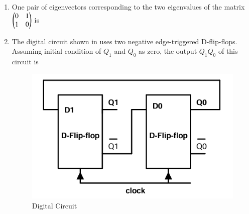 \documentclass[journal,12pt,onecolumn]{IEEEtran}
\theoremstyle{remark}
\begin{document}
\begin{enumerate}
\item One pair of eigenvectors corresponding to the two eigenvalues of the matrix $\begin{pmatrix}0 & 1 \\ 1 & 0\end{pmatrix}$ is  
\par \hfill{}
\begin{enumerate}
\end{enumerate}

\item The digital circuit shown in  uses two negative edge-triggered D-flip-flops. Assuming initial condition of $Q_1$ and $Q_0$ as zero, the output $Q_1 Q_0$ of this circuit is  
\par \hfill{}
\begin{figure}[H]
\centering
\includegraphics[width=0.5\columnwidth]{Figs/Q-28.png}
\caption{Digital Circuit}
\label{28}
\end{figure}
\begin{enumerate}
\end{enumerate}


\end{enumerate}
\end{document}
